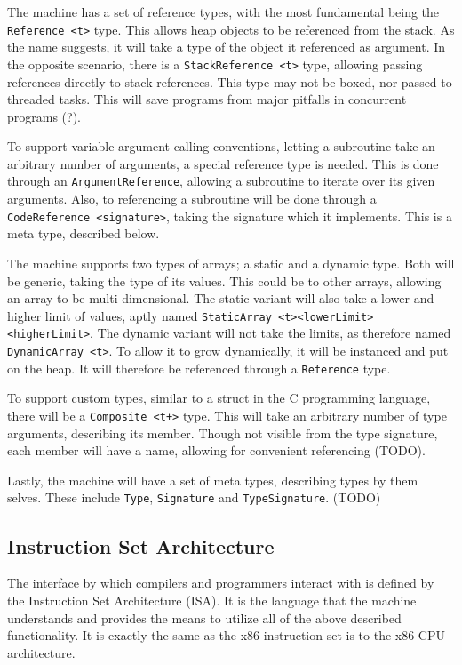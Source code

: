 
The machine has a set of reference types, with the most fundamental being the
{\tt Reference <t>} type. This allows heap objects to be referenced from the
stack. As the name suggests, it will take a type of the object it referenced as
argument. In the opposite scenario, there is a {\tt StackReference <t>} type,
allowing passing references directly to stack references. This type may not be
boxed, nor passed to threaded tasks. This will save programs from major pitfalls
in concurrent programs (?).

To support variable argument calling conventions, letting a subroutine take an
arbitrary number of arguments, a special reference type is needed. This is done
through an {\tt ArgumentReference}, allowing a subroutine to iterate over its
given arguments. Also, to referencing a subroutine will be done through a {\tt
  CodeReference <signature>}, taking the signature which it implements. This is
a meta type, described below.


The machine supports two types of arrays; a static and a dynamic type. Both will
be generic, taking the type of its values. This could be to other arrays,
allowing an array to be multi-dimensional. The static variant will also take a
lower and higher limit of values, aptly named {\tt StaticArray
  <t><lowerLimit><higherLimit>}. The dynamic variant will not take the limits,
as therefore named {\tt DynamicArray <t>}. To allow it to grow dynamically, it
will be instanced and put on the heap. It will therefore be referenced through a
{\tt Reference} type.


To support custom types, similar to a struct in the C programming language,
there will be a {\tt Composite <t+>} type. This will take an arbitrary number of
type arguments, describing its member. Though not visible from the type
signature, each member will have a name, allowing for convenient referencing (TODO).

Lastly, the machine will have a set of meta types, describing types by them
selves. These include {\tt Type}, {\tt Signature} and {\tt TypeSignature}. (TODO)


\subsection{Instruction Set Architecture}

The interface by which compilers and programmers interact with \thename{} is
defined by the Instruction Set Architecture (ISA). It is the language that the
machine understands and provides the means to utilize all of the above described
functionality. It is exactly the same as the x86 instruction set is to the x86
CPU architecture.

